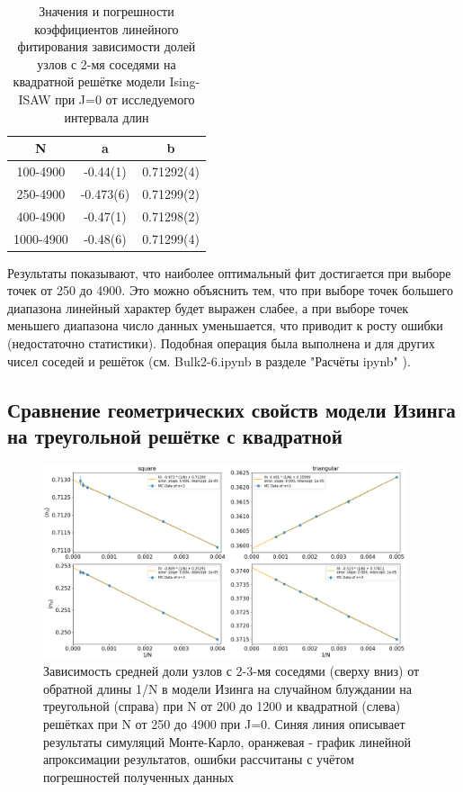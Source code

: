 \begin{table}[]
    \centering
    \begin{tabular}{|c|c|c|} \hline
        N & a & b  \\ \hline
        100-4900 & -0.44(1) & 0.71292(4) \\ \hline
        250-4900 & -0.473(6) & 0.71299(2) \\ \hline
        400-4900 & -0.47(1) & 0.71298(2) \\ \hline
        1000-4900 & -0.48(6) & 0.71299(4) \\ \hline
    \end{tabular}
    \caption{Значения и погрешности коэффициентов линейного фитирования зависимости долей узлов с 2-мя соседями на квадратной решётке модели Ising-ISAW при J=0 от исследуемого интервала длин}
    \label{tab:a_b_n2_square}
\end{table}

Результаты показывают, что наиболее оптимальный фит достигается при выборе точек от 250 до 4900. Это можно объяснить тем, что при выборе точек большего диапазона линейный характер будет выражен слабее, а при выборе точек меньшего диапазона число данных уменьшается, что приводит к росту ошибки (недостаточно статистики). Подобная операция была выполнена и для других чисел соседей и решёток (см. Bulk2-6.ipynb в разделе "Расчёты ipynb" \cite{web:ProjectMagnetRepos}).

\subsection{Сравнение геометрических свойств модели Изинга на треугольной решётке с квадратной}

\begin{figure}
    \centering
    \includegraphics[width=0.95\textwidth]{Sections/Images/triagle_vs_square_bulk.png}
    \caption{Зависимость средней доли узлов с 2-3-мя соседями (сверху вниз) от обратной длины 1/N в модели Изинга на случайном блуждании на треугольной (справа) при N от 200 до 1200 и квадратной (слева) решётках при N от 250 до 4900 при J=0. Синяя линия описывает результаты симуляций Монте-Карло, оранжевая - график линейной апроксимации результатов, ошибки рассчитаны с учётом погрешностей полученных данных}
    \label{fig:tr_vs_sq_bulk}
\end{figure}

